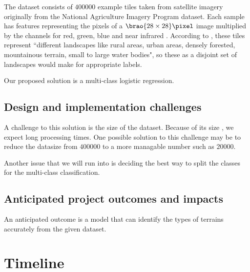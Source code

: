 \documentclass[11pt]{article}
\DeclarePairedDelimiter\brao()%
\begin{document}
The dataset consists of \(\num{400000}\) example tiles
taken from satellite imagery originally from the National Agriculture Imagery Program  dataset.
Each sample has features representing the pixels of a \(\SI[parse-numbers=false]{\brao{28\times28}\!}\pixel\) image 
multiplied by the channels for red, green, blue and near infrared .
According to \textcite{Basu2015a},
these tiles represent ``different landscapes like rural areas, urban areas, densely forested, mountainous terrain, small to large water bodies",
so these as a disjoint set of landscapes would make for appropriate labels.

Our proposed solution is a multi-class logistic regression.

\subsection{Design and implementation challenges}

A challenge to this solution is the size of the dataset.
Because of its size , we expect long processing times.
One possible solution to this challenge may be to reduce the datasize
from \(\num{400000}\) to a more managable number such as
\(\num{20000}\).

Another issue that we will run into is deciding the best way to split the classes for the multi-class classification.

\subsection{Anticipated project outcomes and impacts}

An anticipated outcome is a model that can identify the types of terrains accurately from the given dataset.

\section{Timeline}

\printbibliography
\end{document}
